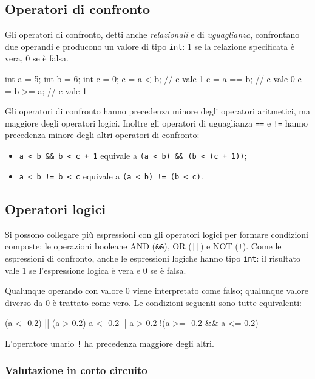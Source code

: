 \documentclass[11pt,a4paper]{article}
\begin{document}
\subsection{Operatori di confronto}

Gli operatori di confronto, detti anche \emph{relazionali} e di \emph{uguaglianza}, confrontano due operandi e producono un valore di tipo \lstinline|int|: $1$ se la relazione specificata è vera, $0$ se è falsa.

\begin{esempio}
\begin{codice}
int a = 5;
int b = 6;
int c = 0;
c = a < b;     // c vale 1
c = a == b;    // c vale 0
c = b >= a;    // c vale 1
\end{codice}
\end{esempio}

Gli operatori di confronto hanno precedenza minore degli operatori aritmetici, ma maggiore degli operatori logici. Inoltre gli operatori di uguaglianza \lstinline|==| e \lstinline|!=| hanno precedenza minore degli altri operatori di confronto:
\begin{itemize}
    \item \lstinline|a < b && b < c + 1| equivale a \lstinline|(a < b) && (b < (c + 1))|;
    \item \lstinline|a < b != b < c| equivale a \lstinline|(a < b) != (b < c)|.
\end{itemize}

\subsection{Operatori logici}

Si possono collegare più espressioni con gli operatori logici per formare condizioni composte: le operazioni booleane AND (\lstinline|&&|), OR (\lstinline/||/) e NOT (\lstinline|!|). Come le espressioni di confronto, anche le espressioni logiche hanno tipo \lstinline|int|: il risultato vale $1$ se l'espressione logica è vera e $0$ se è falsa.

Qualunque operando con valore $0$ viene interpretato come falso; qualunque valore diverso da $0$ è trattato come vero. Le condizioni seguenti sono tutte equivalenti:
\begin{codice}
(a < -0.2) || (a > 0.2)
a < -0.2 || a > 0.2
!(a >= -0.2 && a <= 0.2)
\end{codice}
L'operatore unario \lstinline|!| ha precedenza maggiore degli altri.

\subsubsection{Valutazione in corto circuito}
\end{document}
